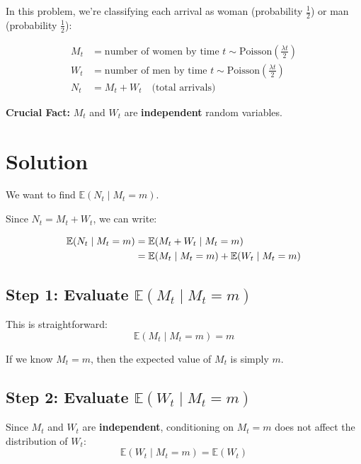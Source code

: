 \documentclass[11pt]{article}
\begin{document}
In this problem, we're classifying each arrival as woman (probability $\frac{1}{2}$) or man (probability $\frac{1}{2}$):

\begin{align*}
M_t &= \text{number of women by time } t \sim \text{Poisson}\left(\frac{\lambda t}{2}\right) \\
W_t &= \text{number of men by time } t \sim \text{Poisson}\left(\frac{\lambda t}{2}\right) \\
N_t &= M_t + W_t \quad \text{(total arrivals)}
\end{align*}

\begin{tcolorbox}[colback=red!5!white,colframe=red!75!black]
\textbf{Crucial Fact:} $M_t$ and $W_t$ are \textbf{independent} random variables.
\end{tcolorbox}

\section{Solution}

We want to find $\mathbb{E}(N_t \mid M_t = m)$.

Since $N_t = M_t + W_t$, we can write:

\begin{align}
\mathbb{E}(N_t \mid M_t = m) &= \mathbb{E}(M_t + W_t \mid M_t = m) \notag \\
&= \mathbb{E}(M_t \mid M_t = m) + \mathbb{E}(W_t \mid M_t = m) \label{eq:linearity}
\end{align}

\subsection{Step 1: Evaluate $\mathbb{E}(M_t \mid M_t = m)$}

This is straightforward:
\[
\mathbb{E}(M_t \mid M_t = m) = m
\]

If we know $M_t = m$, then the expected value of $M_t$ is simply $m$.

\subsection{Step 2: Evaluate $\mathbb{E}(W_t \mid M_t = m)$}

\begin{tcolorbox}[colback=green!5!white,colframe=green!75!black,title=Key Step: Using Independence]
Since $M_t$ and $W_t$ are \textbf{independent}, conditioning on $M_t = m$ does not affect the distribution of $W_t$:
\[
\mathbb{E}(W_t \mid M_t = m) = \mathbb{E}(W_t)
\]
\end{tcolorbox}
\end{document}
